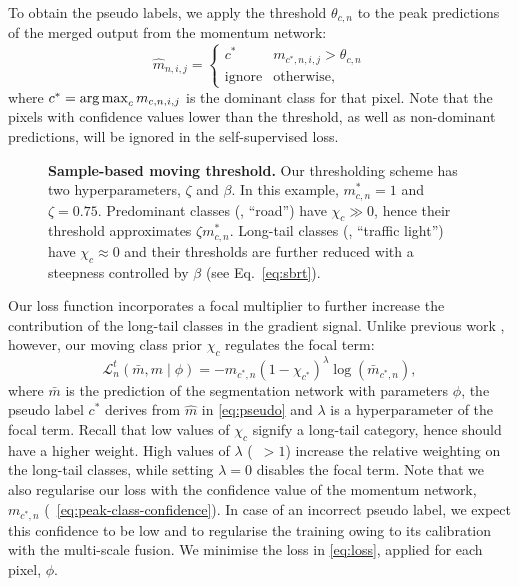 To obtain the pseudo labels, we apply the threshold $\theta_{c,n}$ to the peak predictions of the merged output from the momentum network:
\begin{equation}
\hat{m}_{n,i,j} =
\begin{cases}
      c^\ast & m_{c^\ast,n,i,j} > \theta_{c,n} \\
      \text{ignore} & \text{otherwise},
\end{cases}
\label{eq:pseudo}
\end{equation}
where $c^\ast = \operatorname*{arg\,max}_{c} m_{c,n,i,j}$ is the dominant class for that pixel.
Note that the pixels with confidence values lower than the threshold, as well as non-dominant predictions, will be ignored in the self-supervised loss.

\begin{figure}[t]

\caption{\textbf{Sample-based moving threshold.} Our thresholding scheme has two hyperparameters, $\zeta$ and $\beta$. In this example, $m^\ast_{c,n} = 1$ and $\zeta=0.75$. Predominant classes (\eg, ``road'') have $\chi_c \gg 0$, hence their threshold approximates $\zeta m^\ast_{c,n}$. Long-tail classes (\eg, ``traffic light'') have $\chi_c \approx 0$ and their thresholds are further reduced with a steepness controlled by $\beta$ (see Eq.~\ref{eq:sbrt}).}
\label{fig:threshold}
\end{figure}

Our loss function incorporates a focal multiplier \cite{LinGGHD20} to further increase the contribution of the long-tail classes in the gradient signal.
Unlike previous work \cite{LinGGHD20,subhani2020learning}, however, our moving class prior $\chi_c$ regulates the focal term:
\begin{equation}
\mathcal{L}^t_{n}(\bar{m}, m \mid \phi) = -m_{c^\ast\!,n} (1 - \chi_{c^\ast})^\lambda \log(\bar{m}_{c^\ast\!,n}),
\label{eq:loss}
\end{equation}
where $\bar{m}$ is the prediction of the segmentation network with parameters $\phi$, the pseudo label $c^\ast$ derives from $\hat{m}$ in \cref{eq:pseudo} and $\lambda$ is a hyperparameter of the focal term.
Recall that low values of $\chi_c$ signify a long-tail category, hence should have a higher weight.
High values of $\lambda$ (\ie~$> 1$) increase the relative weighting on the long-tail classes, while setting $\lambda = 0$ disables the focal term.
Note that we also regularise our loss with the confidence value of the momentum network, $m_{c^\ast,n}$ (\Eq~\ref{eq:peak-class-confidence}).
In case of an incorrect pseudo label, we expect this confidence to be low and to regularise the training owing to its calibration with the multi-scale fusion.
We minimise the loss in \cref{eq:loss}, applied for each pixel, \wrt $\phi$.




